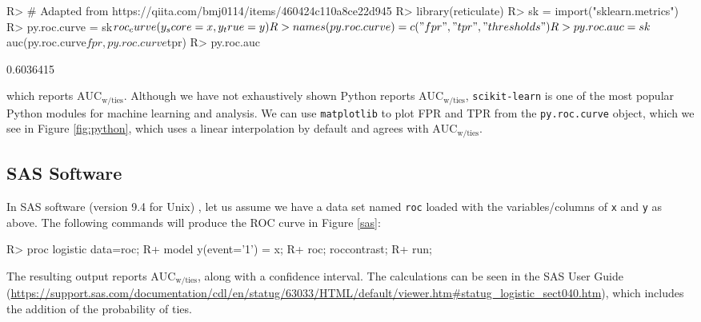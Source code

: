 \documentclass[12pt]{article}
\newenvironment{CodeChunk}{}{}
\begin{document}
\begin{CodeChunk}

\begin{CodeInput}
R> # Adapted from https://qiita.com/bmj0114/items/460424c110a8ce22d945
R> library(reticulate)
R> sk = import("sklearn.metrics")
R> py.roc.curve = sk$roc_curve(y_score = x, y_true = y)
R> names(py.roc.curve) = c("fpr", "tpr", "thresholds")
R> py.roc.auc = sk$auc(py.roc.curve$fpr, py.roc.curve$tpr)
R> py.roc.auc
\end{CodeInput}

\begin{CodeOutput}
[1] 0.6036415
\end{CodeOutput}
\end{CodeChunk}

which reports \(\text{AUC}_{\text{w/ties}}\). Although we have not
exhaustively shown Python reports \(\text{AUC}_{\text{w/ties}}\),
\texttt{scikit-learn} is one of the most popular Python modules for
machine learning and analysis. We can use \texttt{matplotlib}
\citep{matplotlib} to plot FPR and TPR from the \texttt{py.roc.curve}
object, which we see in Figure \ref{fig:python}, which uses a linear
interpolation by default and agrees with \(\text{AUC}_{\text{w/ties}}\).

\hypertarget{sas-software}{%
\subsection{SAS Software}\label{sas-software}}

In SAS software (version 9.4 for Unix) \citep{sas}, let us assume we
have a data set named \texttt{roc} loaded with the variables/columns of
\texttt{x} and \texttt{y} as above. The following commands will produce
the ROC curve in Figure \ref{sas}:

\begin{CodeChunk}

\begin{CodeInput}
R>   proc logistic data=roc;
R+       model y(event='1') = x;
R+       roc; roccontrast;
R+       run;      
\end{CodeInput}
\end{CodeChunk}

The resulting output reports \(\text{AUC}_{\text{w/ties}}\), along with
a confidence interval. The calculations can be seen in the SAS User
Guide
(\url{https://support.sas.com/documentation/cdl/en/statug/63033/HTML/default/viewer.htm\#statug_logistic_sect040.htm}),
which includes the addition of the probability of ties.
\end{document}
